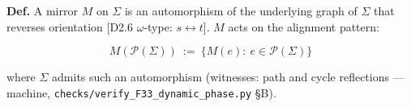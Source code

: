 \begin{definition}\label{tag:Def-EM-22}
\textbf{Def.} A mirror $M$ on $\Sigma$ is an automorphism of the underlying graph of $\Sigma$ that reverses orientation [D2.6 $\omega$-type: $s\leftrightarrow t$]. $M$ acts on the alignment pattern:

\[
M(\mathcal P(\Sigma))\ :=\ \bigl\{M(e):\ e\in\mathcal P(\Sigma)\bigr\}
\]

where $\Sigma$ admits such an automorphism (witnesses: path and cycle reflections — machine, \texttt{checks/\allowbreak{}verify\_\allowbreak{}F33\_\allowbreak{}dynamic\_\allowbreak{}phase.py} §B).

\end{definition}

